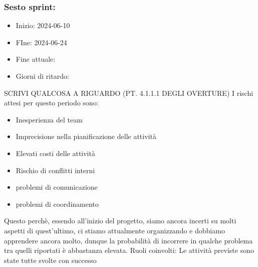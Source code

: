     \subsubsection{Sesto sprint:}
    \begin{itemize}
        \item Inizio: 2024-06-10
        \item FIne: 2024-06-24
        \item Fine attuale:
        \item Giorni di ritardo:
    \end{itemize}
    SCRIVI QUALCOSA A RIGUARDO (PT. 4.1.1.1 DEGLI OVERTURE)
    I rischi attesi per questo periodo sono:
    \begin{itemize}
        \item Inesperienza del team
        \item Imprecisione nella pianificazione delle attività
        \item Elevati costi delle attività
        \item Rischio di conflitti interni 
        \item problemi di comunicazione
        \item problemi di coordinamento
    \end{itemize}
    Questo perchè, essendo all’inizio del progetto, siamo ancora incerti su molti aspetti di quest’ultimo, ci stiamo attualmente organizzando e dobbiamo apprendere ancora molto, dunque la probabilità di incorrere in qualche problema tra quelli riportati è abbastanza elevata.
    Ruoli coinvolti: 
    Le attività previste sono state tutte svolte con successo

